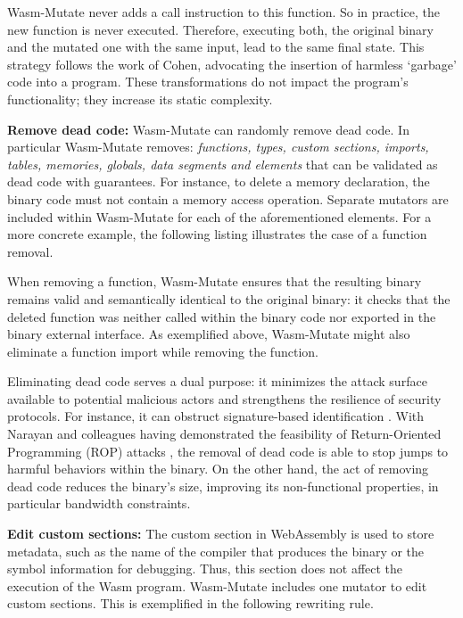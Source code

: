 \documentclass[sigplan,screen]{acmart}
\newcommand{\tool}{{\sc Wasm-Mutate}\xspace}
\begin{document}


\tool never adds a call instruction to this function.
So in practice, the new function is never executed.
Therefore, executing both, the original binary and the mutated one with the same input, lead to the same final state.
This strategy follows the work of Cohen, advocating the insertion of harmless `garbage' code into a program. 
These transformations do not impact the program's functionality; they increase its static complexity.

\textbf{Remove dead code:} \tool can randomly remove dead code.
In particular \tool removes: \emph{functions, types, custom sections, imports, tables, memories, globals, data segments and elements} that can be validated as dead code with guarantees.
For instance, to delete a memory declaration, the binary code must not contain a memory access operation. 
Separate mutators are included within \tool for each of the aforementioned elements.
For a more concrete example, the following listing illustrates the case of a function removal.



When removing a function, \tool ensures that the resulting binary remains valid and semantically identical to the original binary: it checks  that the deleted function was neither called within the binary code nor exported in the binary external interface. 
As exemplified above, \tool might also eliminate a function import while removing the function. 

Eliminating dead code serves a dual purpose: it minimizes the attack surface available to potential malicious actors \cite{236200} and strengthens the resilience of security protocols. 
For instance, it can obstruct signature-based identification \cite{CABRERAARTEAGA2023103296}.
With Narayan and colleagues having demonstrated the feasibility of Return-Oriented Programming (ROP) attacks \cite{Swivel}, the removal of dead code is able to stop jumps to harmful behaviors within the binary. 
On the other hand, the act of removing dead code  reduces the binary's size, improving its non-functional properties, in particular bandwidth constraints. 


\textbf{Edit custom sections:}
The custom section in WebAssembly is used to store metadata, such as the name of the compiler that produces the binary or the symbol information for debugging.
Thus, this section does not affect the execution of the Wasm program.
\tool includes one mutator to edit custom sections. 
This is exemplified in the following rewriting rule. 
\end{document}
